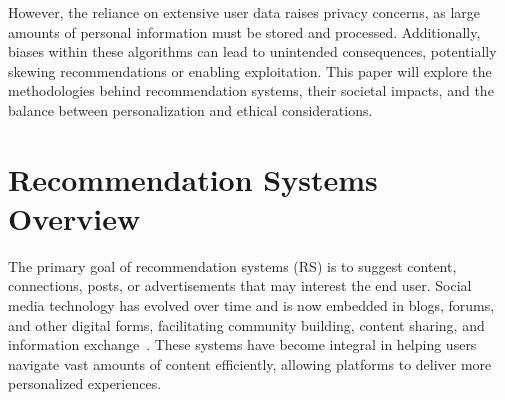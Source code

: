 \documentclass[10pt,twocolumn,twoside,a4paper]{report} %
\begin{document}
However, the reliance on extensive user data raises privacy concerns, as large amounts of personal information must
be stored and processed. Additionally, biases within these algorithms can lead to unintended consequences, potentially
skewing recommendations or enabling exploitation. This paper will explore the methodologies behind recommendation systems,
their societal impacts, and the balance between personalization and ethical considerations.

\section{Recommendation Systems Overview} \label{rec_sys_overview}
The primary goal of recommendation systems (RS) is to suggest content, connections, posts, or advertisements that may interest the end user. Social media technology has evolved over time and is now embedded in blogs, forums, and other digital forms, facilitating community building, content sharing, and information exchange~\cite{anandhan2018social}. These systems have become integral in helping users navigate vast amounts of content efficiently, allowing platforms to deliver more personalized experiences.
\end{document}

